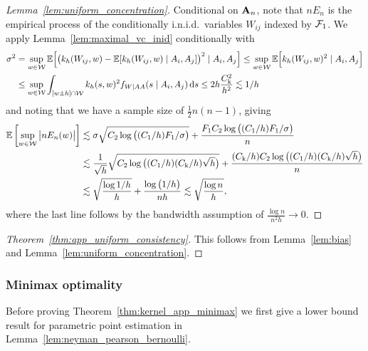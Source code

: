\begin{proof}[Lemma~\ref{lem:uniform_concentration}]

  Conditional on $\mathbf{A}_n$,
  note that $n E_n$
  is the empirical process of the conditionally
  i.n.i.d.\ variables $W_{ij}$
  indexed by $\mathcal{F}_1$.
  We apply Lemma~\ref{lem:maximal_vc_inid}
  conditionally with
  \begin{align*}
    \sigma^2
    &=
    \sup_{w \in \mathcal{W}}
    \mathbb{E}\Big[
      \big(
      k_h(W_{ij},w)
      - \mathbb{E}[k_h(W_{ij},w) \mid A_i, A_j]
      \big)^2
      \mid A_i, A_j
      \Big]
    \leq
    \sup_{w \in \mathcal{W}}
    \mathbb{E}\Big[
      k_h(W_{ij},w)^2
      \mid A_i, A_j
      \Big] \\
    &\leq
    \sup_{w \in \mathcal{W}}
    \int_{[w \pm h] \cap \mathcal{W}}
    k_h(s,w)^2
    f_{W \mid AA}(s \mid A_i, A_j)
    \,\mathrm{d}s
    \leq 2h \frac{C_\mathrm{k}^2}{h^2}
    \lesssim 1/h
  \end{align*}
  and noting that we have
  a sample size of
  $\frac{1}{2}n(n-1)$,
  giving
  \begin{align*}
    \mathbb{E} \left[
      \sup_{w \in \mathcal{W}}
      \big| n E_n(w) \big|
    \right]
    &\lesssim
    \sigma
    \sqrt{C_2 \log \big((C_1/h) F_1 / \sigma \big)}
    +
    \frac{F_1 C_2 \log \big((C_1/h) F_1 / \sigma\big)}
    {n} \\
    &\lesssim
    \frac{1}{\sqrt h}
    \sqrt{C_2 \log \big((C_1/h) (C_\mathrm{k}/h) \sqrt h \big)}
    +
    \frac{(C_\mathrm{k}/h) C_2 \log \big((C_1/h) (C_\mathrm{k}/h) \sqrt h \big)}
    {n} \\
    &\lesssim
    \sqrt{\frac{\log 1/h}{h}}
    +
    \frac{\log \big(1/h\big)}
    {nh}
    \lesssim
    \sqrt{\frac{\log n}{h}},
  \end{align*}
  where the last line follows by the bandwidth assumption
  of $\frac{\log n}{n^2h} \to 0$.
\end{proof}

\begin{proof}[Theorem~\ref{thm:app_uniform_consistency}]

  This follows from Lemma~\ref{lem:bias}
  and Lemma~\ref{lem:uniform_concentration}.
\end{proof}

\subsubsection{Minimax optimality}

Before proving Theorem~\ref{thm:kernel_app_minimax}
we first give a lower bound result
for parametric point estimation in
Lemma~\ref{lem:neyman_pearson_bernoulli}.

